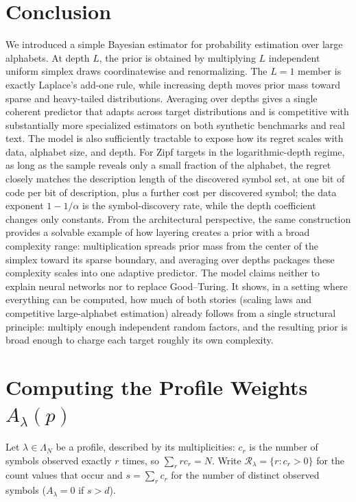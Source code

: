 \documentclass[11pt]{article}
\newcommand{\Nseq}{N}
\begin{document}
\section{Conclusion}
\label{sec:conclusion}
We introduced a simple Bayesian estimator for probability estimation over
large alphabets.  At depth \(L\), the prior is obtained by multiplying
\(L\) independent uniform simplex draws coordinatewise and renormalizing.
The \(L=1\) member is exactly Laplace's add-one rule, while increasing depth
moves prior mass toward sparse and heavy-tailed distributions.  Averaging
over depths gives a single coherent predictor that adapts across target
distributions and is competitive with substantially more specialized
estimators on both synthetic benchmarks and real text.
The model is also sufficiently tractable to expose how its regret scales
with data, alphabet size, and depth.
For Zipf targets in the logarithmic-depth regime, as long as the
sample reveals only a small fraction of the alphabet, the regret closely matches the description length of the discovered symbol set, at one
bit of code per bit of description, plus a further cost per
discovered symbol;
the data exponent \(1-1/\alpha\) is the symbol-discovery rate, while
the depth coefficient changes only constants.  From the architectural perspective, the same
construction provides a solvable example of how layering creates a prior
with a broad complexity range: multiplication spreads prior mass from the
center of the simplex toward its sparse boundary, and averaging over depths
packages these complexity scales into one adaptive predictor.
The model claims neither to explain neural networks nor to replace
Good--Turing.  It shows, in a setting where everything can be computed, how
much of both stories (scaling laws and competitive large-alphabet
estimation) already follows from a single structural principle: multiply
enough independent random factors, and the resulting prior is broad enough
to charge each target roughly its own complexity.
\clearpage
\appendix
\section{Computing the Profile Weights \texorpdfstring{\(A_\lambda(p)\)}{A-lambda(p)}}
\label{sec:app-profile-weights}
Let \(\lambda\in\Lambda_\Nseq\) be a profile, described by its
multiplicities: \(c_r\) is the number of symbols observed exactly \(r\)
times, so \(\sum_r rc_r=\Nseq\).  Write
\(\mathcal R_\lambda=\{r:c_r>0\}\) for the count values that occur and
\(s=\sum_r c_r\) for the number of distinct observed symbols (\(A_\lambda=0\) if
\(s>d\)).
\end{document}
